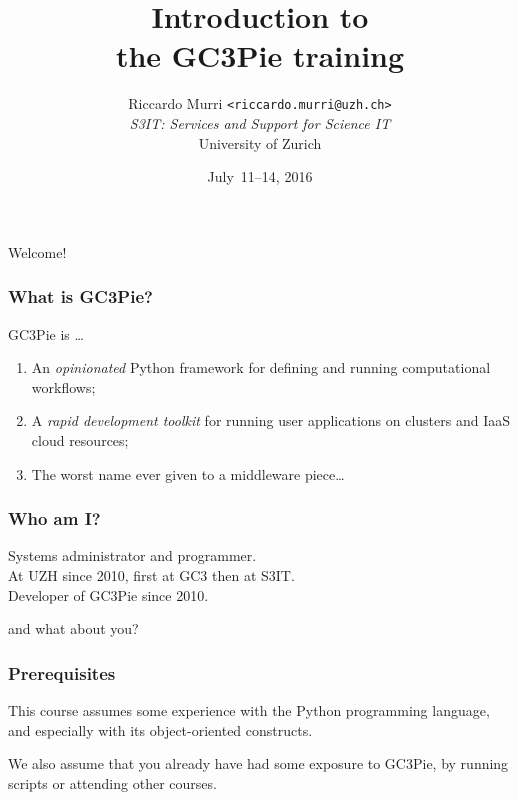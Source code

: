 \documentclass[english,serif,mathserif,xcolor=pdftex,dvipsnames,table]{beamer}
\title[Introduction]{%
  Introduction to \\ the GC3Pie training
}
\author[R. Murri, S3IT UZH]{%
  Riccardo Murri \texttt{<riccardo.murri@uzh.ch>}
  \\[1ex]
  \emph{S3IT: Services and Support for Science IT}
  \\[1ex]
  University of Zurich
}
\date{July~11--14, 2016}
\begin{document}
\maketitle

\begin{frame}
  \begin{center}
    {\Huge Welcome!}
  \end{center}
\end{frame}


\begin{frame}
  \frametitle{What is GC3Pie?}
  GC3Pie is \ldots
  \begin{enumerate}
  \item \alert<2>{An \emph{opinionated} Python framework for defining and running computational workflows;}
  \item A \emph{rapid development toolkit} for running user applications on clusters and IaaS cloud resources;
  \item The worst name ever given to a middleware piece\ldots
  \end{enumerate}

  \+
\end{frame}


\begin{frame}
  \frametitle{Who am I?}
  \begin{center}
    Systems administrator and programmer.
    \\ \+
    At UZH since 2010, first at GC3 then at S3IT.
    \\ \+
    Developer of GC3Pie since 2010.
  \end{center}
\end{frame}


\begin{frame}
  \begin{center}
    {\Huge and what about you?}
  \end{center}
\end{frame}


\begin{frame}
  \frametitle{Prerequisites}
  This course assumes some experience with the Python programming
  language, and especially with its  object-oriented constructs.

  \+
  We also assume that you already have had some exposure to GC3Pie,
  by running scripts or attending other courses.
\end{frame}
\end{document}
